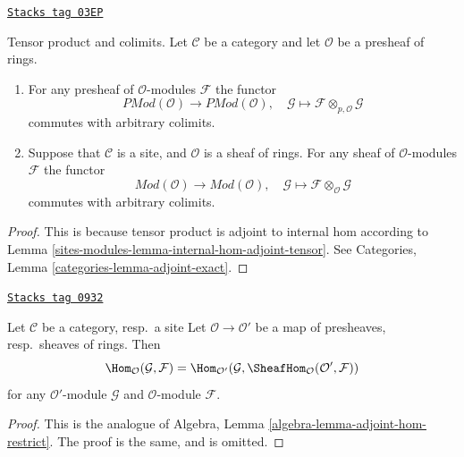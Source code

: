 \begin{lemma}
\label{sites-modules-lemma-tensor-commute-colimits}
\href{https://stacks.math.columbia.edu/tag/03EP}{\texttt{Stacks tag 03EP}}

Tensor product and colimits.
Let $\mathcal{C}$ be a category and let $\mathcal{O}$ be a presheaf of rings.
\begin{enumerate}
\item For any presheaf of $\mathcal{O}$-modules $\mathcal{F}$ the functor
$$
\textit{PMod}(\mathcal{O}) \longrightarrow \textit{PMod}(\mathcal{O})
, \quad
\mathcal{G} \longmapsto \mathcal{F} \otimes_{p, \mathcal{O}} \mathcal{G}
$$
commutes with arbitrary colimits.
\item
Suppose that $\mathcal{C}$ is a site, and $\mathcal{O}$ is a sheaf of rings.
For any sheaf of $\mathcal{O}$-modules $\mathcal{F}$ the functor
$$
\textit{Mod}(\mathcal{O}) \longrightarrow \textit{Mod}(\mathcal{O})
, \quad
\mathcal{G} \longmapsto \mathcal{F} \otimes_\mathcal{O} \mathcal{G}
$$
commutes with arbitrary colimits.
\end{enumerate}
\end{lemma}

\begin{proof}
This is because tensor product is adjoint to internal hom according
to Lemma \ref{sites-modules-lemma-internal-hom-adjoint-tensor}.
See Categories, Lemma \ref{categories-lemma-adjoint-exact}.
\end{proof}

\begin{lemma}
\label{sites-modules-lemma-adjoint-hom-restrict}
\href{https://stacks.math.columbia.edu/tag/0932}{\texttt{Stacks tag 0932}}

Let $\mathcal{C}$ be a category, resp.\ a site
Let $\mathcal{O} \to \mathcal{O}'$ be a map of presheaves, resp.\ sheaves
of rings. Then
$$
\Hom_\mathcal{O}(\mathcal{G}, \mathcal{F}) =
\Hom_{\mathcal{O}'}(\mathcal{G},
\SheafHom_\mathcal{O}(\mathcal{O}', \mathcal{F}))
$$
for any $\mathcal{O}'$-module $\mathcal{G}$ and $\mathcal{O}$-module
$\mathcal{F}$.
\end{lemma}

\begin{proof}
This is the analogue of
Algebra, Lemma \ref{algebra-lemma-adjoint-hom-restrict}.
The proof is the same, and is omitted.
\end{proof}

